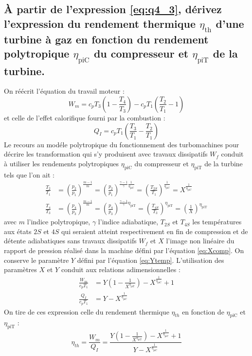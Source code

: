 \newcommand{\pit}{\eta_\text{piT}}
\newcommand{\pic}{\eta_\text{piC}}
\subsection{À partir de l'expression \ref{eq:q4_3}, dérivez l'expression du rendement thermique $\eta_\text{th}$ d'une turbine à gaz en fonction du rendement polytropique $\pic$ du compresseur et $\pit$ de la turbine.\label{q:9.4}}
On réécrit l'équation du travail moteur :
\begin{equation} W_m = c_pT_3\left(1-\frac{T_4}{T_3}\right) - c_pT_1\left(\frac{T_2}{T_1}-1\right) \end{equation}
et celle de l'effet calorifique fourni par la combustion :
\begin{equation} Q_I = c_pT_1\left(\frac{T_3}{T_1}-\frac{T_2}{T_1}\right)\end{equation}
Le recours au modéle polytropique du fonctionnement des turbomachines pour décrire les transformation qui s'y produisent avec travaux dissipatifs $W_f$ conduit à utiliser les rendements polytropiques $\pic$ du compresseur et $\pit$ de la turbine tels que l'on ait :
\begin{align} \frac{T_2}{T_1} &= \left(\frac{p_2}{p_1}\right)^{\frac{m-1}{m}} = \left(\frac{p_2}{p_1}\right)^{\frac{\gamma-1}{\gamma}\frac{1}{\pic}} = \left(\frac{T_{2S}}{T_1}\right)^{\frac{1}{\pic}} = X^{\frac{1}{\pic}} \\ \frac{T_4}{T_3} &= \left(\frac{p_4}{p_3}\right)^{\frac{m-1}{m}} = \left(\frac{p_4}{p_3}\right)^{\frac{\gamma-1}{\gamma}\pit} = \left(\frac{T_{4S}}{T_3}\right)^{\pit} = \left(\frac{1}{X}\right)^{\pit} \end{align}
avec $m$ l'indice polytropique, $\gamma$ l'indice adiabatique, $T_{2S}$ et $T_{4S}$ les températures aux états $2S$ et $4S$ qui seraient atteint respectivement en fin de compression et de détente adiabatiques sans travaux dissipatifs $W_f$ et $X$ l'image non linéaire du rapport de pression réalisé dans la machine défini par l'équation \ref{eq:Xcomp}. On conserve le paramètre $Y$ défini par l'équation \ref{eq:Ytemp}. L'utilisation des paramètres $X$ et $Y$ conduit aux relations adimensionnelles :
\begin{align} \frac{W_m}{c_pT_1} &= Y\left(1-\frac{1}{X^{\pit}}\right) - X^{\frac{1}{\pic}} + 1 \\ \frac{Q_I}{c_pT_1} &= Y - X^{\frac{1}{\pic}} \end{align}
On tire de ces expression celle du rendement thermique $\eta_{th}$ en fonction de $\pic$ et $\pit$ :
\begin{equation} \eta_{th} = \frac{W_m}{Q_I} = \frac{Y\left(1-\frac{1}{X^{\pit}}\right) - X^{\frac{1}{\pic}} + 1}{Y - X^{\frac{1}{\pic}}} \end{equation}


